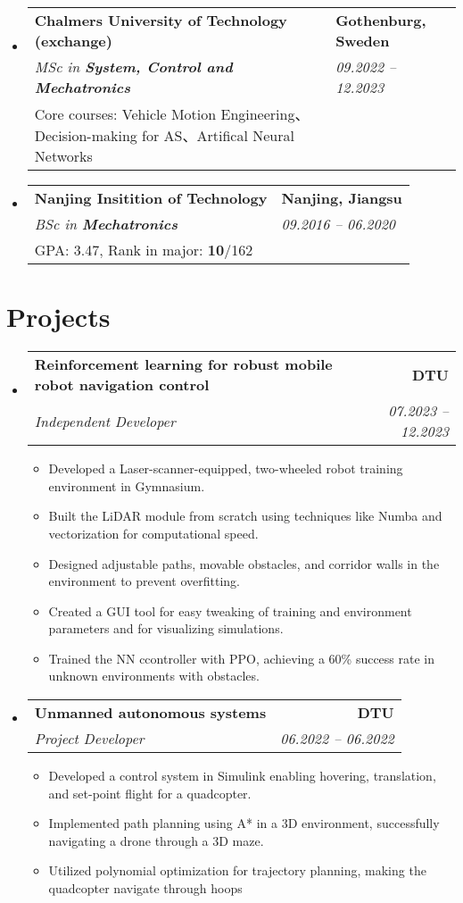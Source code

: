\documentclass[letterpaper,11pt]{article}
\makeatletter
\newcommand{\resumeItem}[1]{
  \item\small{
    {#1 \vspace{-2pt}}
  }
}
\newcommand{\resumeSubheading}[4]{
  \vspace{-2pt}\item\small{
    \begin{tabular*}{0.97\textwidth}[t]{l@{\extracolsep{\fill}}r}
      \textbf{#1} & \textbf{#2} \\
      \textit{#3} & \textit{#4} \\
    \end{tabular*}\vspace{-7pt}
  }
}
\newcommand{\resumeSubheadingExtended}[5]{  
  \item\small{
    \begin{tabular*}{0.97\textwidth}{@{}p{0.8\textwidth}p{0.52\textwidth}@{}}
      \textbf{#1} & \textbf{#2} \\  %
      \textit{#3} & \textit{#4} \\  %
      #5 &  %
    \end{tabular*}\vspace{-10pt}
  }
}
\newcommand{\resumeSubHeadingListStart}{\begin{itemize}[leftmargin=0.15in, label={}]}
\newcommand{\resumeSubHeadingListEnd}{\end{itemize}}
\newcommand{\resumeItemListStart}{\begin{itemize}}
\newcommand{\resumeItemListEnd}{\end{itemize}\vspace{-5pt}}
\makeatother
\begin{document}
  \vspace{0.5mm} %

  \resumeSubHeadingListStart
    \resumeSubheadingExtended
      {Chalmers University of Technology (exchange)}{Gothenburg, Sweden}
      {MSc in \textbf{System, Control and Mechatronics}}{09.2022 -- 12.2023}
      {Core courses: Vehicle Motion Engineering、Decision-making for AS、Artifical Neural Networks}
  \resumeSubHeadingListEnd
  
  \vspace{0.5mm} %

  \resumeSubHeadingListStart
    \resumeSubheadingExtended
      {Nanjing Insitition of Technology}{Nanjing, Jiangsu}
      {BSc in \textbf{Mechatronics}}{09.2016 -- 06.2020}
      {GPA: 3.47, Rank in major: \textbf{10}/162}
  \resumeSubHeadingListEnd

\section{Projects}
  \resumeSubHeadingListStart

    \resumeSubheading
      {\textbf{Reinforcement learning for robust
      mobile robot navigation control \; \href{https://1drv.ms/v/s!Al-YZOpjHxorgslaTIu4oeTj8TYROw?e=EflSJj}{\faVideoCamera} \;  \href{https://github.com/SpartanTan/RLATR}{\faGithub}}}{DTU}
      {Independent Developer}{07.2023 -- 12.2023}
      \resumeItemListStart
        \resumeItem{Developed a Laser-scanner-equipped, two-wheeled robot training environment in Gymnasium.} 
        \resumeItem{Built the LiDAR module from scratch using techniques like Numba and vectorization for computational speed.} 
        \resumeItem{Designed adjustable paths, movable obstacles, and corridor walls in the environment to prevent overfitting.} 
        \resumeItem{Created a GUI tool for easy tweaking of training and environment parameters and for visualizing simulations.} \resumeItem{Trained the NN ccontroller with PPO, achieving a 60\% success rate in unknown environments with obstacles.}
      \resumeItemListEnd
      
    \resumeSubheading
      {\textbf{Unmanned autonomous systems \; \href{https://1drv.ms/v/s!Al-YZOpjHxorgslZm5SJR7mVF_eoPw?e=4kRkvd}{\faVideoCamera} \;  \href{https://github.com/SpartanTan/31390-UAS-2022}{\faGithub}}}{DTU}
      {Project Developer}{06.2022 -- 06.2022}
      \resumeItemListStart
      \resumeItem{Developed a control system in Simulink enabling hovering, translation, and set-point flight for a quadcopter.} 
      \resumeItem{Implemented path planning using A* in a 3D environment, successfully navigating a drone through a 3D maze.} 
      \resumeItem{Utilized polynomial optimization for trajectory planning, making the quadcopter navigate through hoops}
      \resumeItemListEnd
  \resumeSubHeadingListEnd
\end{document}
